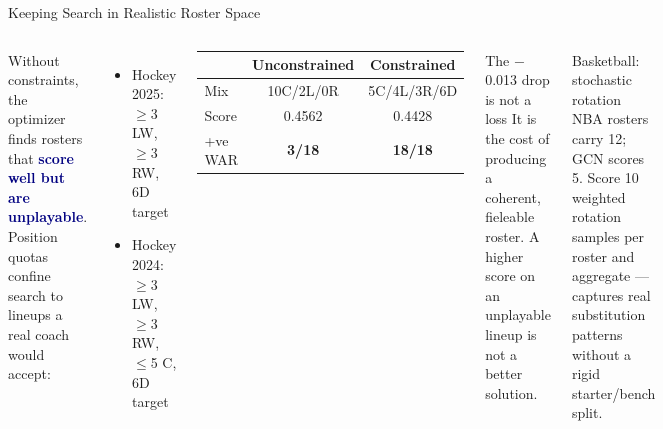 \documentclass[aspectratio=169,11pt]{beamer}
\newcommand{\good}[1]{\textcolor{bgrn}{\textbf{#1}}}
\newcommand{\bad}[1]{\textcolor{bred}{\textbf{#1}}}
\newcommand{\hl}[1]{\textcolor{navy}{\textbf{#1}}}
\begin{document}
\begin{frame}{Keeping Search in Realistic Roster Space}
\begin{columns}[T]
Without constraints, the optimizer finds rosters that \hl{score well but are unplayable}.
Position quotas confine search to lineups a real coach would accept:
\begin{itemize}
  \item Hockey 2025: $\geq$3 LW, $\geq$3 RW, 6D target
  \item Hockey 2024: $\geq$3 LW, $\geq$3 RW, $\leq$5 C, 6D target
\end{itemize}
\vspace{0.4em}
\begin{center}\small
\begin{tabular}{lcc}
\toprule
 & Unconstrained & Constrained \\
\midrule
Mix     & 10C/2L/0R     & 5C/4L/3R/6D \\
Score   & 0.4562        & 0.4428 \\
+ve WAR & \bad{3/18}    & \good{18/18} \\
\bottomrule
\end{tabular}
\end{center}

\begin{exampleblock}{The $-$0.013 drop is not a loss}
  It is the cost of producing a coherent, fieleable roster. A higher score on an unplayable lineup is not a better solution.
\end{exampleblock}
\vspace{0.5em}
\begin{block}{Basketball: stochastic rotation}
  NBA rosters carry 12; GCN scores 5. Score 10 weighted rotation samples per roster and aggregate — captures real substitution patterns without a rigid starter/bench split.
\end{block}
\end{columns}
\end{frame}
\end{document}
